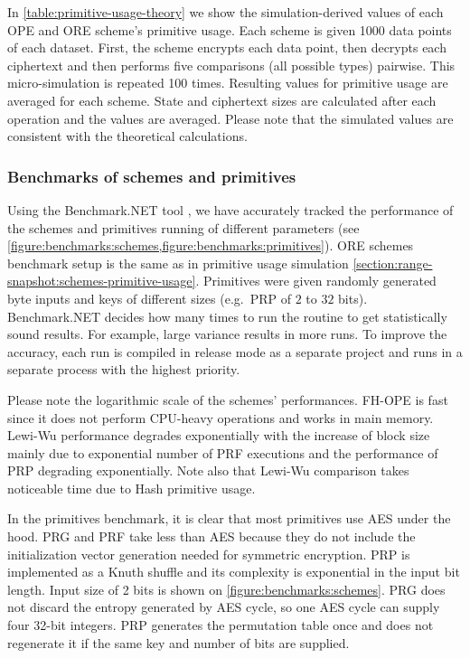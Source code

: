 			In \cref{table:primitive-usage-theory} we show the simulation-derived values of each OPE and ORE scheme's primitive usage.
			Each scheme is given 1000 data points of each dataset.
			First, the scheme encrypts each data point, then decrypts each ciphertext and then performs five comparisons (all possible types) pairwise.
			This micro-simulation is repeated 100 times.
			Resulting values for primitive usage are averaged for each scheme.
			State and ciphertext sizes are calculated after each operation and the values are averaged.
			Please note that the simulated values are consistent with the theoretical calculations.

		\subsubsection{Benchmarks of schemes and primitives}

			Using the Benchmark.NET tool \cite{benchmark-net}, we have accurately tracked the performance of the schemes and primitives running of different parameters (see \cref{figure:benchmarks:schemes,figure:benchmarks:primitives}).
			ORE schemes benchmark setup is the same as in primitive usage simulation \cref{section:range-snapshot:schemes-primitive-usage}.
			Primitives were given randomly generated byte inputs and keys of different sizes (e.g.\ PRP of $2$ to $32$ bits).
			Benchmark.NET decides how many times to run the routine to get statistically sound results.
			For example, large variance results in more runs.
			To improve the accuracy, each run is compiled in release mode as a separate project and runs in a separate process with the highest priority.

			Please note the logarithmic scale of the schemes' performances.
			FH-OPE is fast since it does not perform CPU-heavy operations and works in main memory.
			Lewi-Wu performance degrades exponentially with the increase of block size mainly due to exponential number of PRF executions and the performance of PRP degrading exponentially.
			Note also that Lewi-Wu comparison takes noticeable time due to Hash primitive usage.

			In the primitives benchmark, it is clear that most primitives use AES under the hood.
			PRG and PRF take less than AES because they do not include the initialization vector generation needed for symmetric encryption.
			PRP is implemented as a Knuth shuffle \cite{knuth-shuffle} and its complexity is exponential in the input bit length.
			Input size of 2 bits is shown on \cref{figure:benchmarks:schemes}.
			PRG does not discard the entropy generated by AES cycle, so one AES cycle can supply four 32-bit integers.
			PRP generates the permutation table once and does not regenerate it if the same key and number of bits are supplied.

